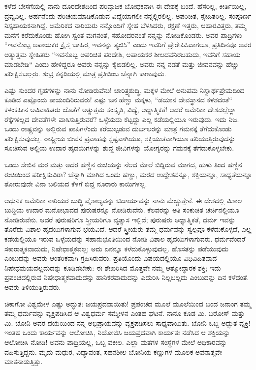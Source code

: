 ಕಳೆದ ಬೇಸಗೆಯಲ್ಲಿ ನಾನು ದೂರದೇಶದಿಂದ ಪರಿವ್ರಾಜಕ ಬೋಧಕನಾಗಿ ಈ ದೇಶಕ್ಕೆ ಬಂದೆ. ಹೆಸರಿಲ್ಲ, ಕೀರ್ತಿಯಿಲ್ಲ, ದ್ರವ್ಯವಿಲ್ಲ. ಅರ್ಹನೆಂದು ಪರಿಚಯಮಾಡಿಕೊಡುವ ವಿದ್ಯೆಯಾಗಲೀ ನನ್ನಲ್ಲಿರಲಿಲ್ಲ. ಅಪರಿಚಿತ, ಸ್ನೇಹಿತರಿಲ್ಲ. ಸಂಪೂರ್ಣ ನಿಸ್ಸಹಾಯಕನಾಗಿದ್ದೆ. ಅಮೆರಿಕದ ನಾರಿಯರು ನನ್ನೊಂದಿಗೆ ಸ್ನೇಹ ಬೆಳಸಿದರು, ರಕ್ಷಣೆ ಇತ್ತರು, ಆಹಾರವಿತ್ತರು, ತಮ್ಮ ಮನೆಗೆ ಕರೆದುಕೊಂಡು ಹೋಗಿ ಸ್ವಂತ ಮಗನಂತೆ, ಸಹೋದರನಂತೆ ನನ್ನನ್ನು ನೋಡಿಕೊಂಡರು. ಅವರ ಪಾದ್ರಿಗಳು “ಇವನೊಬ್ಬ ಅಪಾಯಕರ ಕ್ರೈಸ್ತ ಬಾಹಿರ, ಇವನನ್ನು ತ್ಯಜಿಸಿ” ಎಂದು ಇವರಿಗೆ ಪ್ರೇರೇಪಿಸಿದಾಗಲೂ, ಪ್ರತಿದಿನವೂ ಅವರ ಅತ್ಯುತ್ತಮ ಸ್ನೇಹಿತರು “ಇವನೊಬ್ಬ ಅಪರಿಚಿತ ಪರದೇಶಿ, ಅಪಾಯಕರ ಶೀಲದವನಿರಬಹುದು, ಇವನಿಗೆ ಸಹಾಯ ಮಾಡಬೇಡಿ“ ಎಂದು ಹೇಳಿದ್ದರೂ ಅವರು ನನ್ನನ್ನು ಕೈಬಿಡಲಿಲ್ಲ. ಅವರು ನನ್ನ ನಡತೆ ಮತ್ತು ಜೀವನವನ್ನು ಹೆಚ್ಚು ಪರೀಕ್ಷಿಸಬಲ್ಲರು. ಶುಭ್ರ ಕನ್ನಡಿಯಲ್ಲಿ ಮಾತ್ರ ಪ್ರತಿಬಿಂಬ ಚೆನ್ನಾಗಿ ಕಾಣುವುದು.

ಎಷ್ಟು ಸುಂದರ ಗೃಹಗಳನ್ನು ನಾನು ನೋಡಿರುವೆನು! ಚಾರಿತ್ರ್ಯಶುದ್ಧಿ, ಮಕ್ಕಳ ಮೇಲೆ ಅನುಪಮ ನಿಸ್ವಾರ್ಥಪ್ರೇಮದಿಂದ ಕೂಡಿದ ಎಷ್ಟೊಂದು ತಾಯಂದಿರಿರುವರು! ಎಷ್ಟು ಜನ ಹೆಣ್ಣು ಮಕ್ಕಳು, “ಡಯಾನ ದೇವಸ್ಥಾನದ ಕಳಶದಂತೆ“ ಕಳಂಕಹೀನ ಅವಿವಾಹಿತರು\enginline{-} ಜೊತೆಗೆ ಅತ್ಯುತ್ತಮ ಸಂಸ್ಕೃತಿ, ವಿಧ್ಯೆ, ಆಧ್ಯಾತ್ಮಿಕತೆ! ಆದರೆ ಅಮೆರಿಕಾ ದೇಶದಲ್ಲೆಲ್ಲಾ ರೆಕ್ಕೆಗಳಿಲ್ಲದ ದೇವತೆಗಳೇ ವಾಸಿಸುತ್ತಿರುವರೆ? ಒಳ್ಳೆಯದು ಕೆಟ್ಟದ್ದು ಎಲ್ಲ ಕಡೆಯಲ್ಲಿಯೂ ಇರುವುದು. ಇದು ನಿಜ. ಒಂದು ರಾಷ್ಟ್ರವನ್ನು ಅಲ್ಲಿರುವ ಪಾಪಿಗಳೆಂದು ಕರೆಯಲ್ಪಡುವ ದುರ್ಬಲರನ್ನು ಮಾತ್ರ ಗಮನಕ್ಕೆ ತೆಗೆದುಕೊಂಡು ಪರೀಕ್ಷಿಸುವುದಲ್ಲ. ರಾಷ್ಟ್ರೀಯ ಜೀವನ ಪ್ರವಾಹವು ಸ್ಪಷ್ಟವಾಗಿಯೂ, ಶಕ್ತಿಯುತವಾಗಿಯೂ ಹರಿಯುತ್ತಿರುವುದನ್ನು ಸೂಚಿಸುವ ಅಲ್ಲಿಯ ಉದಾರ ಹೃದಯಿಗಳನ್ನು ಶುದ್ಧ ಜೀವಿಗಳನ್ನು ಯೋಗ್ಯರನ್ನು ಗಮನಕ್ಕೆ ತೆಗೆದುಕೊಳ್ಳಬೇಕು.

ಒಂದು ಸೇಬಿನ ಮರ ಮತ್ತು ಅದರ ಹಣ್ಣಿನ ರುಚಿಯನ್ನು ನೆಲದ ಮೇಲೆ ಬಿದ್ದಿರುವ ಮಾಗದ, ಹುಳು ತಿಂದ ಹಣ್ಣಿನ ರುಚಿಯಿಂದ ಪರೀಕ್ಷಿಸುವಿರಾ? ಚೆನ್ನಾಗಿ ಮಾಗಿದ ಒಂದು ಹಣ್ಣು, ಮರದ ಉದ್ದೇಶವನ್ನೂ, ಶಕ್ತಿಯನ್ನೂ, ಸಾಧ್ಯತೆಯನ್ನೂ ತೋರುವುದೇ ವಿನಾ ಬಲಿಯದ ಕೆಳಗೆ ಬಿದ್ದ ನೂರಾರು ಕಾಯಿಗಳಲ್ಲ.

ಆಧುನಿಕ ಅಮೆರಿಕಾ ನಾರಿಯರ ಬುದ್ಧಿ ವೈಶಾಲ್ಯವನ್ನು ಔದಾರ್ಯವನ್ನು ನಾನು ಮೆಚ್ಚುತ್ತೇನೆ. ಈ ದೇಶದಲ್ಲಿ ವಿಶಾಲ ಬುದ್ಧಿಯ ಉದಾರ ಮನೋಭಾವದ ಪುರುಷರನ್ನೂ ನೋಡಿರುವೆನು. ಕೆಲವರನ್ನು ಅತಿ ಸಂಕುಚಿತ ಚರ್ಚಿನಲ್ಲಿಯೂ ನೋಡಿರುವೆನು. ಆದರೆ ಪುರುಷರಿಗೂ ಸ್ತ್ರೀಯರಿಗೂ ವ್ಯತ್ಯಾಸ ಇಲ್ಲಿದೆ; ಪುರುಷರು ಆಧ್ಯಾತ್ಮಿಕತೆ, ಧರ್ಮ ಇವನ್ನು ತೊರೆದು ವಿಶಾಲ ಹೃದಯಿಗಳಾಗುವ ಭಯವಿದೆ. ಆದರೆ ಸ್ತ್ರೀಯರು ತಮ್ಮ ಧರ್ಮವನ್ನು ಸ್ವಲ್ಪವೂ ಕಳೆದುಕೊಳ್ಳದೆ, ಎಲ್ಲ ಕಡೆಯಲ್ಲಿಯೂ ಇರುವ ಒಳ್ಳೆಯದನ್ನು ಸಹಾನುಭೂತಿಯಿಂದ ನೋಡಿ ವಿಶಾಲ ಹೃದಯಿಗಳಾಗುವರು. ಧರ್ಮವೆಂದರೆ ಸಕಾರಾತ್ಮಕವಾದುದು, ನಿಷೇಧಾತ್ಮಕವಲ್ಲ; ಅದು ಏನನ್ನೂ ಕಳೆದುಕೊಳ್ಳುವುದಲ್ಲ. ಹೊಸತನ್ನು ಪಡೆಯುವುದು ಎಂಬುದನ್ನು ಅವರು ಆಂತರಿಕವಾಗಿ ಗ್ರಹಿಸಿರುವರು. ಪ್ರತಿಯೊಂದು ವಿಷಯದಲ್ಲಿಯೂ ವಿಧಿವಿಹಿತವಾದ ನಿಷೇಧಮಯವಲ್ಲದುದನ್ನು ಕೂಡಿಡಬೇಕು: ಈ ಶೇಖರಿಸಿದ ಮೊತ್ತವೇ ನಮ್ಮ ಆತ್ಮೋದ್ಧಾರಕ ಶಕ್ತಿ; ಇದು ಪ್ರಪಂಚದಲ್ಲಿರುವ ನಿಷೇಧಾತ್ಮಕವಾದುದನ್ನು ಹಾನಿಕರವಾದುದನ್ನು ಎದುರಿಸಿ ನಿಲ್ಲಬಲ್ಲದು ಎಂಬುದನ್ನು ದಿನ ಕಳೆದಂತೆ. ಅವರು ತಿಳಿಯುತ್ತಿರುವರು.

ಚಿಕಾಗೋ ವಿಶ್ವಮೇಳ ಎಷ್ಟು ಅದ್ಭುತ: ಜಯಪ್ರದವಾಯಿತು! ಪ್ರಪಂಚದ ಮೂಲೆ ಮೂಲೆಯಿಂದ ಬಂದ ಜನಾಂಗ ತಮ್ಮ ತಮ್ಮ ಧರ್ಮವನ್ನು ವ್ಯಕ್ತಪಡಿಸಿದ ಆ ವಿಶ್ವಧರ್ಮ ಸಮ್ಮೇಳನ ಎಂತಹ ಘಟನೆ. ನಾನೂ ಕೂಡ ಮಿ. ಬರೋಸ್ ಮತ್ತು ಮಿ. ಬೋನಿ ಅವರ ದಯೆಯಿಂದ ನನ್ನ ಅಭಿಪ್ರಾಯವನ್ನು ವ್ಯಕ್ತಪಡಿಸಲು ಸಾಧ್ಯವಾಯಿತು. ಬೋನಿ ಒಬ್ಬ ಅದ್ಭುತ ವ್ಯಕ್ತಿ! ಇಂತಹ ಒಂದು ಕಾರ್ಯವನ್ನು ಆಲೋಚಿಸಿ, ನಿಯೋಜಿಸಿ ಜಯಪ್ರದವಾಗಿ ಕಾರ್ಯತಃ ನಡೆಸಿದ ಆ ಶಕ್ತಿಯನ್ನು ಆಲೋಚಿಸಿ ನೋಡಿ! ಅವನು ಪಾದ್ರಿಯಲ್ಲ, ಒಬ್ಬ ವಕೀಲ. ಎಲ್ಲಾ ಮತಗಳ ಸಂಸ್ಥೆಗಳ ಮೇಲೆ ಅಧಿಕಾರವನ್ನು ವಹಿಸುತ್ತಿದ್ದನು. ಮೃದು ಮಧುರ, ವಿದ್ಯಾವಂತ, ಸಹನಶೀಲ ಬೋನಿಯ ಕಣ್ಣುಗಳ ಮೂಲಕ ಅವನಾತ್ಮವೇ ಮಾತನಾಡುತ್ತಿತ್ತು.

